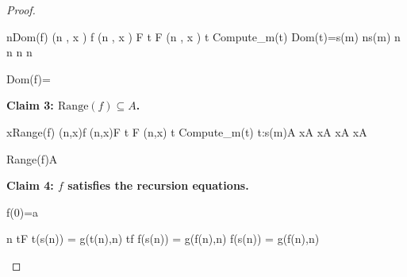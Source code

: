 \documentclass[10pt,a4paper]{book}
\begin{document}
\begin{proof}
\begin{fitchproof}[arrayenv=tabular]
        \open
         {n\in Dom(f)} 
        \open
         { (n , x ) \in f } 
         { (n , x ) \in \bigcup F } 
        \open
         { t \in F } 
         { (n , x ) \in t } 
        \open
         {Compute_m(t)} 
         {Dom(t)=s(m)} 
         {n\in s(m)} 
         {n\in{}} 
        \close
         {n\in{}} 
        \close
         {n\in{}} 
        \close
         {n\in{}} 
        \close

         {Dom(f)=} 

    \end{fitchproof}

    \textbf{Claim 3: $\text{Range}(f) \subseteq A$.}


    \begin{fitchproof}[arrayenv=tabular]
        \open
         {x\in Range(f)} 
        \open
         {(n,x)\in f} 
         {(n,x)\in \bigcup F} 
        \open
         {t \in F} 
         {(n,x) \in t} 
        \open
         {Compute_m(t)} 
         {t:s(m)\to A} 
         {x\in A} 
        \close
         {x\in A} 
        \close
         {x\in A} 
        \close
         {x\in A} 
        \close

         {Range(f)\subseteq A} 

    \end{fitchproof}



    \textbf{Claim 4: $f$ satisfies the recursion equations.}



    \begin{fitchproof}[arrayenv=tabular]

         {f(0)=a}

        \open
         {n\in{}}
        \open
         {t\in F}
         {t(s(n)) =  g(t(n),n)}
         {t\subseteq f}
         {f(s(n)) =   g(f(n),n)}
        \close
         {f(s(n)) =   g(f(n),n)}
        \close


\end{fitchproof}
\end{proof}
\end{document}
